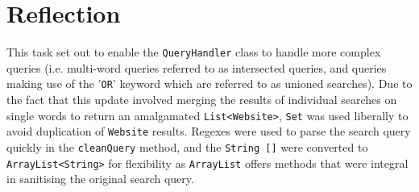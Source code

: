 \section{Reflection} %
This task set out to enable the {\tt QueryHandler} class to handle more complex queries (i.e. multi-word queries referred to as intersected queries, and queries making use of the '{\tt OR}' keyword which are referred to as unioned searches).
Due to the fact that this update involved merging the results of individual searches on single words to return an amalgamated {\tt List<Website>}, {\tt Set} was used liberally to avoid duplication of {\tt Website} results.
Regexes were used to parse the search query quickly in the {\tt cleanQuery} method, and the {\tt String []} were converted to {\tt ArrayList<String>} for flexibility as {\tt ArrayList} offers methods that were integral in sanitising the original search query.


